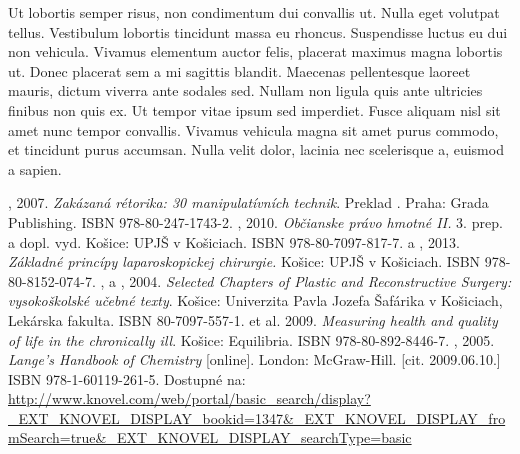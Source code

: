 \documentclass[thesismargins, thesislinespacing, twoside, upjsfrontpage]{rnthesis}
\begin{document}
\zaver

Ut lobortis semper risus, non condimentum dui convallis ut. Nulla eget volutpat tellus. Vestibulum lobortis tincidunt massa eu rhoncus. Suspendisse luctus eu dui non vehicula. Vivamus elementum auctor felis, placerat maximus magna lobortis ut. Donec placerat sem a mi sagittis blandit. Maecenas pellentesque laoreet mauris, dictum viverra ante sodales sed. Nullam non ligula quis ante ultricies finibus non quis ex. Ut tempor vitae ipsum sed imperdiet. Fusce aliquam nisl sit amet nunc tempor convallis. Vivamus vehicula magna sit amet purus commodo, et tincidunt purus accumsan. Nulla velit dolor, lacinia nec scelerisque a, euismod a sapien. 
%

\begin{thebibliography}{9}
%
	, 2007. \emph{Zakázaná rétorika: 30 manipulatívních technik}. Preklad
. Praha: Grada Publishing. ISBN 978-80-247-1743-2.
	, 2010. \emph{Občianske právo hmotné II.} 3. prep. a dopl. vyd. Košice: UPJŠ v Košiciach. ISBN 978-80-7097-817-7.
	 a , 2013. \emph{Základné princípy laparoskopickej chirurgie.} Košice: UPJŠ v Košiciach. ISBN 978-80-8152-074-7.
	,  a , 2004. \emph{Selected Chapters of Plastic and Reconstructive Surgery: vysokoškolské učebné texty}. Košice: Univerzita Pavla Jozefa Šafárika v Košiciach, Lekárska fakulta. ISBN 80-7097-557-1.
	 et al. 2009. \emph{Measuring health and quality of life in the chronically ill}. Košice: Equilibria. ISBN 978-80-892-8446-7.
	, 2005. \emph{Lange's Handbook of Chemistry} [online]. London: McGraw-Hill. [cit. 2009.06.10.] ISBN 978-1-60119-261-5. Dostupné na: \url{http://www.knovel.com/web/portal/basic_search/display?_EXT_KNOVEL_DISPLAY_bookid=1347&_EXT_KNOVEL_DISPLAY_fromSearch=true&_EXT_KNOVEL_DISPLAY_searchType=basic}

\end{thebibliography}
\end{document}
